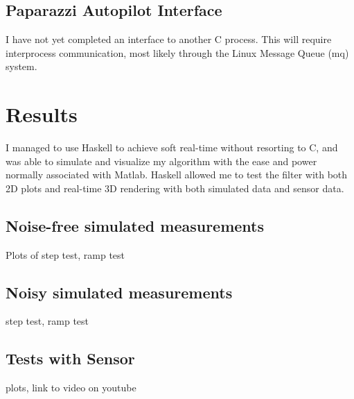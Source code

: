 \documentclass[12pt]{report}
\begin{document}
\subsection{Paparazzi Autopilot Interface}
I have not yet completed an interface to another C process. This will require interprocess communication, most likely through the Linux Message Queue (mq) system.

\section{Results}

I managed to use Haskell to achieve soft real-time without resorting to C, and was able to simulate and visualize my algorithm with the ease and power normally associated with Matlab. Haskell allowed me to test the filter with both 2D plots and real-time 3D rendering with both simulated data and sensor data.

\subsection{Noise-free simulated measurements}
Plots of step test, ramp test
\subsection{Noisy simulated measurements}
step test, ramp test
\subsection{Tests with Sensor}
plots, link to video on youtube
\end{document}
